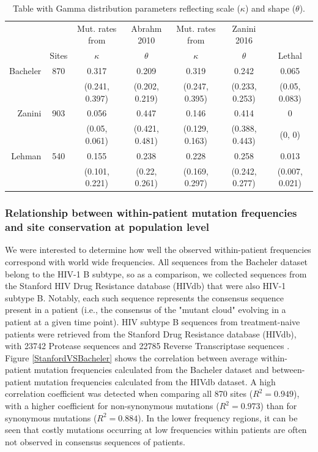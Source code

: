\documentclass{article}
\begin{document}
 
\begin{table}[ht!]
\centering
\begin{tabular}{rc|cc|cc|c}
  \hline
  & & Mut. rates from  & Abrahm 2010 & Mut. rates from & Zanini 2016& \\
 & Sites & $\kappa$  & $\theta$ & $\kappa$ & $\theta$ & Lethal \\ 
  \hline
Bacheler & 870 & 0.317 & 0.209 & 0.319 & 0.242 & 0.065 \\ 
    &  & (0.241, 0.397) & (0.202, 0.219) & (0.247, 0.395) & (0.233, 0.253) & (0.05, 0.083) \\ 
  Zanini & 903 & 0.056 & 0.447 & 0.146 & 0.414 & 0 \\ 
     &  & (0.05, 0.061) & (0.421, 0.481) & (0.129, 0.163) & (0.388, 0.443) & (0, 0) \\ 
 Lehman & 540 & 0.155 & 0.238 & 0.228 & 0.258 & 0.013 \\ 
     &  & (0.101, 0.221) & (0.22, 0.261) & (0.169, 0.297) & (0.242, 0.277) & (0.007, 0.021) \\ 
   \hline
\end{tabular}
\label{TableGamma}
\caption{Table with Gamma distribution parameters reflecting scale ($\kappa$) and shape ($\theta$).}
\end{table}

\pagebreak

\subsubsection*{Relationship between within-patient mutation frequencies and site conservation at population level}
We were interested to determine how well the observed within-patient frequencies correspond with world wide frequencies. All sequences from the Bacheler dataset belong to the HIV-1 B subtype, so as a comparison, we collected sequences from the Stanford HIV Drug Resistance database (HIVdb) that were also HIV-1 subtype B. Notably, each such sequence represents the consensus sequence present in a patient (i.e., the consensus of the "mutant cloud" evolving in a patient at a given time point).  HIV subtype B sequences from treatment-naive patients were retrieved from the Stanford Drug Resistance database (HIVdb), with 23742 Protease sequences and 22785 Reverse Transcriptase sequences \cite{rhee2003human}. 
Figure \ref{StanfordVSBacheler} shows the correlation between average within-patient mutation frequencies calculated from the Bacheler dataset and  between-patient mutation frequencies calculated from the HIVdb dataset. A high correlation coefficient was detected when comparing all 870 sites ($R^2= 0.949$), with a higher coefficient for non-synonymous mutations ($R^2 = 0.973$) than for synonymous mutations ($R^2 = 0.884$). In the lower frequency regions, it can be seen that costly mutations occurring at low frequencies within patients are often not observed in consensus sequences of patients. 
\end{document}
